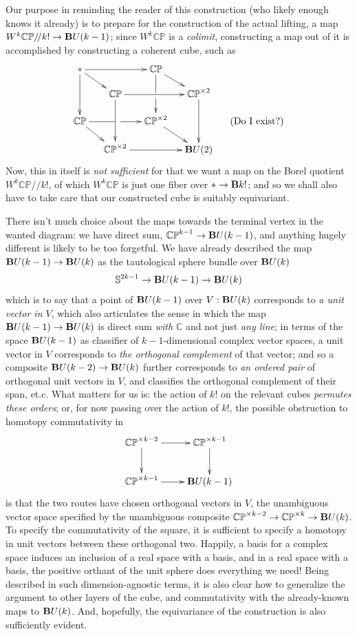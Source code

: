 \documentclass{article}
\newcommand{\CC}{\mathbb{C}}
\newcommand{\CP}{\mathbb{CP}}
\newcommand{\sph}{\mathbb{S}}
\newcommand{\6}{\partial}
\newcommand{\8}{\infty}
\newcommand{\bq}{/\!/}
\begin{document}
Our purpose in reminding the reader of this construction (who likely enough knows it already) is to prepare for the construction of the actual lifting, a map $W^k \CP\bq k! \to \deloop U(k-1)$; since $W^k\CP$ is a {\em colimit}, constructing a map out of it is accomplished by constructing a coherent cube, such as
$$ \begin{xy}\xymatrix@=1.2em{
 {*} \ar[rr] \ar[dr] \ar[dd] &  & \CP \ar[dr] \ar[dd]|\hole\\
    & \CP \ar[dd] \ar[rr] &  & \CP^{\times 2} \ar[dd] \\
 \CP \ar[rr]|\hole \ar[dr]   &  & \CP^{\times 2} \ar[dr]  & & \mbox{(Do I exist?)} \\ 
  & \CP^{\times 2} \ar[rr] &  & \deloop U(2) }\end{xy} $$
Now, this in itself is {\em not sufficient} for that we want a map on the Borel quotient $W^k\CP\bq k!$, of which $W^k\CP$ is just one fiber over $* \to \mathbf{B} k!$; and so we shall also have to take care that our constructed cube is suitably equivariant.

There isn't much choice about the maps towards the terminal vertex in the wanted diagram: we have direct sum, $\CP^{k-1}\to \deloop U(k-1)$, and anything hugely different is likely to be too forgetful.  We have already described the map $\mathbf{B} U(k-1)\to \mathbf{B} U(k)$ as the tautological sphere bundle over $\mathbf{B} U(k)$
$$ \sph^{2k-1} \to \deloop U(k-1) \to \deloop U(k) $$
which is to say that a point of $\mathbf{B} U(k-1)$ over $V:\mathbf{B} U(k)$ corresponds to {\em a unit vector in $V$}, which also articulates the sense in which the map $\mathbf{B} U(k-1)\to \mathbf{B} U(k)$ is direct sum {\em with $\CC$} and not just {\em any line}; in terms of the space $\mathbf{B} U(k-1)$ as classifier of $k-1$-dimensional complex vector spaces, a unit vector in $V$ corresponds to {\em the orthogonal complement} of that vector; and so a composite $\mathbf{B} U(k-2) \to \mathbf{B} U(k)$ further corresponds to {\em an ordered pair} of orthogonal unit vectors in $V$, and classifies the orthogonal complement of their span, et.c.  What matters for us is: the action of $k!$ on the relevant cubes {\em permutes these orders}; or, for now passing over the action of $k!$, the possible obstruction to homotopy commutativity in 
$$\begin{xy}\xymatrix{ \CP^{\times k-2} \ar[r] \ar[d] & \CP^{\times k-1} \ar[d] \\
\CP^{\times k-1} \ar[r] & \deloop U(k-1) 
}\end{xy}$$
is that the two routes have chosen orthogonal vectors in $V$, the unambiguous vector space specified by the unambiguous composite $\CP^{\times k-2} \to \CP^{\times k} \to \deloop U(k)$.  To specify the commutativity of the square, it is sufficient to specify a homotopy in unit vectors between these orthogonal two.  Happily, a basis for a complex space induces an inclusion of a real space with a basis, and in a real space with a basis, the positive orthant of the unit sphere does everything we need!  Being described in such dimension-agnostic terms, it is also clear how to generalize the argument to other layers of the cube, and commutativity with the already-known maps to $\mathbf{B} U(k)$.  And, hopefully, the equivariance of the construction is also sufficiently evident.
\end{document}
